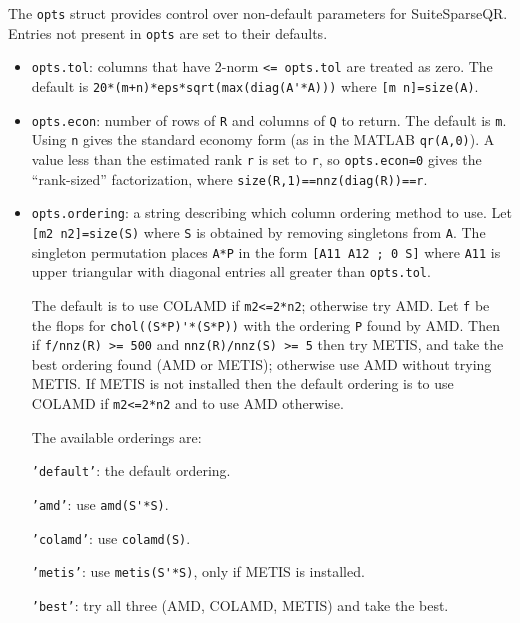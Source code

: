 \documentclass[12pt]{article}
\begin{document}
The \verb'opts' struct provides control over non-default parameters for
SuiteSparseQR.  Entries not present in \verb'opts' are set to their defaults.

\begin{itemize}

    \item \verb'opts.tol':   columns that have 2-norm \verb'<= opts.tol' are
    treated as zero. The default is \verb"20*(m+n)*eps*sqrt(max(diag(A'*A)))"
    where \verb'[m n]=size(A)'.

    \item \verb'opts.econ':  number of rows of \verb'R' and columns of \verb'Q'
    to return.  The default is \verb'm'.  Using \verb'n' gives the standard
    economy form (as in the MATLAB \verb'qr(A,0)').  A value less than the
    estimated rank \verb'r' is set to \verb'r', so \verb'opts.econ=0' gives
    the ``rank-sized'' factorization, where \verb'size(R,1)==nnz(diag(R))==r'.

    \item \verb'opts.ordering': a string describing which column ordering
    method to use.  Let \newline
    \verb'[m2 n2]=size(S)' where \verb'S' is obtained by
    removing singletons from \verb'A'.  The singleton permutation places
    \verb'A*P' in the form \verb'[A11 A12 ; 0 S]' where \verb'A11' is upper
    triangular with diagonal entries all greater than \verb'opts.tol'.

    The default is to use COLAMD if \verb'm2<=2*n2'; otherwise try AMD.  Let
    \verb'f' be the flops for \verb"chol((S*P)'*(S*P))" with the ordering
    \verb'P' found by AMD.  Then if \verb'f/nnz(R) >= 500' and
    \verb'nnz(R)/nnz(S) >= 5' then try METIS, and take the best ordering found
    (AMD or METIS); otherwise use AMD without trying METIS.  If METIS is not
    installed then the default ordering is to use COLAMD if \verb'm2<=2*n2' and
    to use AMD otherwise.

    The available orderings are:

       {\tt 'default'}: the default ordering.

       {\tt 'amd'}: use \verb"amd(S'*S)".

       {\tt 'colamd'}: use \verb"colamd(S)".

       {\tt 'metis'}: use \verb"metis(S'*S)", only if METIS is
       installed.

       {\tt 'best'}: try all three (AMD, COLAMD, METIS) and take the
       best.


\end{itemize}
\end{document}
